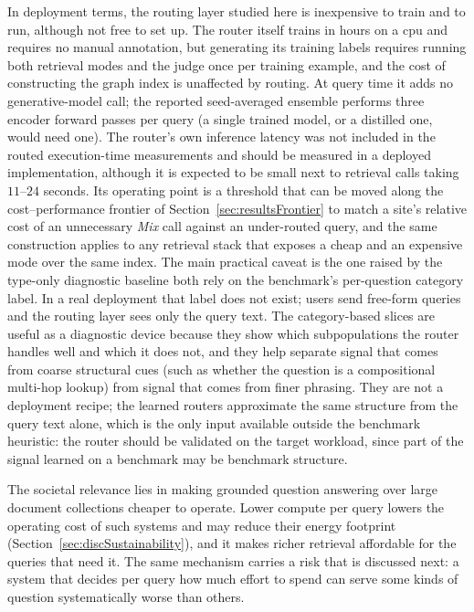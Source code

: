 \documentclass[english, bibtex]{kththesis}               %
\numberwithin{listing}{chapter}
\providecommand{\DIFaddtex}[1]{{\protect\color{blue} \sf #1}} %
\providecommand{\DIFdeltex}[1]{{\protect\color{red} \scriptsize #1}} %
\providecommand{\DIFaddbegin}{} %
\providecommand{\DIFaddend}{} %
\providecommand{\DIFdelbegin}{} %
\providecommand{\DIFdelend}{} %
\providecommand{\DIFadd}[1]{\texorpdfstring{\DIFaddtex{#1}}{#1}} %
\providecommand{\DIFdel}[1]{\texorpdfstring{\DIFdeltex{#1}}{}} %
\begin{document}
\DIFadd{In deployment terms, the routing layer studied here is inexpensive to train and to run, although not free to set up. The router itself trains in hours on a \gls{cpu} and requires no manual annotation, but generating its training labels requires running both retrieval modes and the judge once per training example, and the cost of constructing the graph index is unaffected by routing. At query time it adds no generative-model call; the reported seed-averaged ensemble performs three encoder forward passes per query (a single trained model, or a distilled one, would need one). The router's own inference latency was not included in the routed execution-time measurements and should be measured in a deployed implementation, although it is expected to be small next to retrieval calls taking $11$--$24$ seconds. Its operating point is a threshold that can be moved along the cost--performance frontier of Section~\ref{sec:resultsFrontier} to match a site's relative cost of an unnecessary \emph{Mix} call against an under-routed query, and the same construction applies to any retrieval stack that exposes a cheap and an expensive mode over the same index. The main practical caveat is the one raised by the }\DIFaddend type-only \DIFdelbegin \DIFdel{diagnostic baseline both rely on the benchmark's per-question category label. In a real deployment that label does not exist; users send free-form queries and the routing layer sees only the query text. The category-based slices are useful as a diagnostic device because they show which subpopulations the router handles well and which it does not, and they help separate signal that comes from coarse structural cues (such as whether the question is a compositional multi-hop lookup) from signal that comes from finer phrasing. They are not a deployment recipe; the learned routers approximate the same structure from the query text alone, which is the only input available outside the benchmark}\DIFdelend \DIFaddbegin \DIFadd{heuristic: the router should be validated on the target workload, since part of the signal learned on a benchmark may be benchmark structure.
}

\DIFadd{The societal relevance lies in making grounded question answering over large document collections cheaper to operate. Lower compute per query lowers the operating cost of such systems and may reduce their energy footprint (Section~\ref{sec:discSustainability}), and it makes richer retrieval affordable for the queries that need it. The same mechanism carries a risk that is discussed next: a system that decides per query how much effort to spend can serve some kinds of question systematically worse than others.
}
\end{document}
